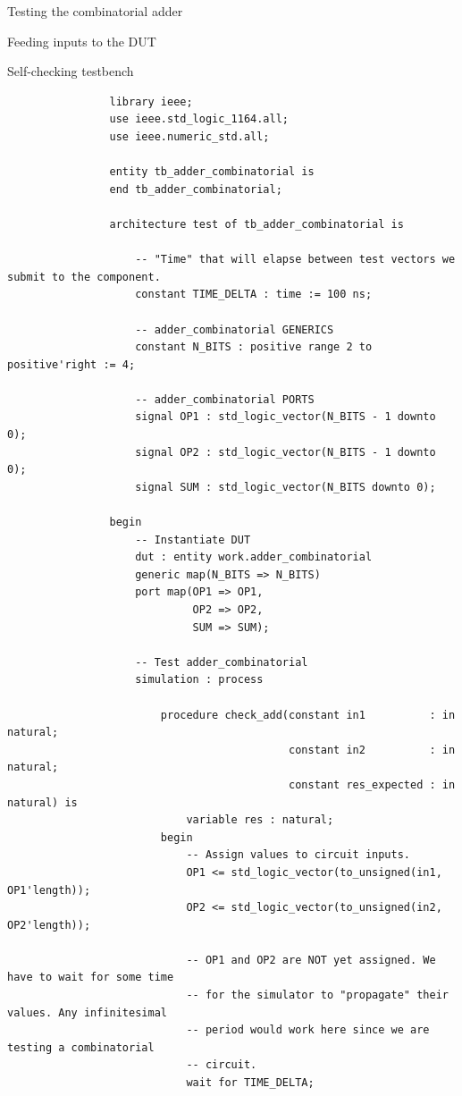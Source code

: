 \documentclass[a4paper, 12pt, onecolumn]{article}
\begin{document}
\begin{section}{Testing the combinatorial adder}
\begin{subsection}{Feeding inputs to the DUT}
\begin{subsubsection}{Self-checking testbench}
            \begin{verbatim}
                library ieee;
                use ieee.std_logic_1164.all;
                use ieee.numeric_std.all;

                entity tb_adder_combinatorial is
                end tb_adder_combinatorial;

                architecture test of tb_adder_combinatorial is

                    -- "Time" that will elapse between test vectors we submit to the component.
                    constant TIME_DELTA : time := 100 ns;

                    -- adder_combinatorial GENERICS
                    constant N_BITS : positive range 2 to positive'right := 4;

                    -- adder_combinatorial PORTS
                    signal OP1 : std_logic_vector(N_BITS - 1 downto 0);
                    signal OP2 : std_logic_vector(N_BITS - 1 downto 0);
                    signal SUM : std_logic_vector(N_BITS downto 0);

                begin
                    -- Instantiate DUT
                    dut : entity work.adder_combinatorial
                    generic map(N_BITS => N_BITS)
                    port map(OP1 => OP1,
                             OP2 => OP2,
                             SUM => SUM);

                    -- Test adder_combinatorial
                    simulation : process

                        procedure check_add(constant in1          : in natural;
                                            constant in2          : in natural;
                                            constant res_expected : in natural) is
                            variable res : natural;
                        begin
                            -- Assign values to circuit inputs.
                            OP1 <= std_logic_vector(to_unsigned(in1, OP1'length));
                            OP2 <= std_logic_vector(to_unsigned(in2, OP2'length));

                            -- OP1 and OP2 are NOT yet assigned. We have to wait for some time
                            -- for the simulator to "propagate" their values. Any infinitesimal
                            -- period would work here since we are testing a combinatorial
                            -- circuit.
                            wait for TIME_DELTA;


\end{verbatim}
\end{subsubsection}
\end{subsection}
\end{section}
\end{document}
